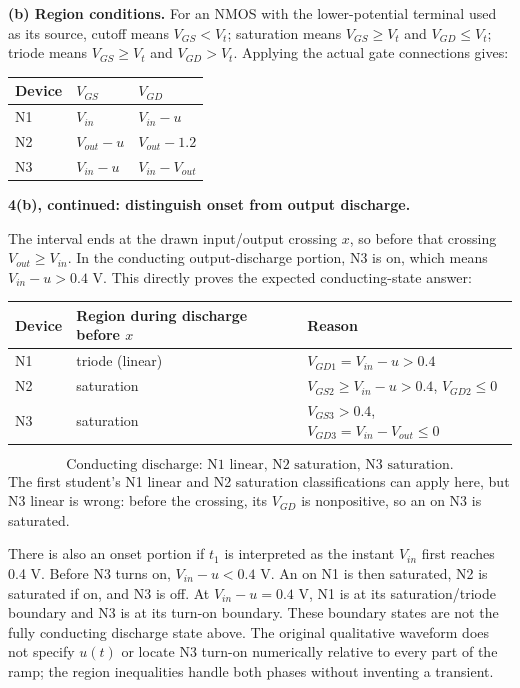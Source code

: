 \documentclass[10pt]{article}
\begin{document}
\textbf{(b) Region conditions.} For an NMOS with the lower-potential terminal used as its source, cutoff means $V_{GS}<V_t$; saturation means $V_{GS}\ge V_t$ and $V_{GD}\le V_t$; triode means $V_{GS}\ge V_t$ and $V_{GD}>V_t$. Applying the actual gate connections gives:
\begin{center}\begin{tabular}{lll}\toprule Device & $V_{GS}$ & $V_{GD}$\\\midrule N1 & $V_{in}$ & $V_{in}-u$\\N2 & $V_{out}-u$ & $V_{out}-1.2$\\N3 & $V_{in}-u$ & $V_{in}-V_{out}$\\\bottomrule\end{tabular}\end{center}
\newpage
\textbf{4(b), continued: distinguish onset from output discharge.}

The interval ends at the drawn input/output crossing $x$, so before that crossing $V_{out}\ge V_{in}$. In the conducting output-discharge portion, N3 is on, which means $V_{in}-u>0.4$ V. This directly proves the expected conducting-state answer:
\begin{center}\begin{tabular}{lll}\toprule Device & Region during discharge before $x$ & Reason\\\midrule N1 & triode (linear) & $V_{GD1}=V_{in}-u>0.4$\\N2 & saturation & $V_{GS2}\ge V_{in}-u>0.4$, $V_{GD2}\le0$\\N3 & saturation & $V_{GS3}>0.4$, $V_{GD3}=V_{in}-V_{out}\le0$\\\bottomrule\end{tabular}\end{center}
\[\boxed{\text{Conducting discharge: N1 linear, N2 saturation, N3 saturation.}}\]
The first student's N1 linear and N2 saturation classifications can apply here, but N3 linear is wrong: before the crossing, its $V_{GD}$ is nonpositive, so an on N3 is saturated.

There is also an onset portion if $t_1$ is interpreted as the instant $V_{in}$ first reaches 0.4 V. Before N3 turns on, $V_{in}-u<0.4$ V. An on N1 is then saturated, N2 is saturated if on, and N3 is off. At $V_{in}-u=0.4$ V, N1 is at its saturation/triode boundary and N3 is at its turn-on boundary. These boundary states are not the fully conducting discharge state above. The original qualitative waveform does not specify $u(t)$ or locate N3 turn-on numerically relative to every part of the ramp; the region inequalities handle both phases without inventing a transient.
\end{document}
